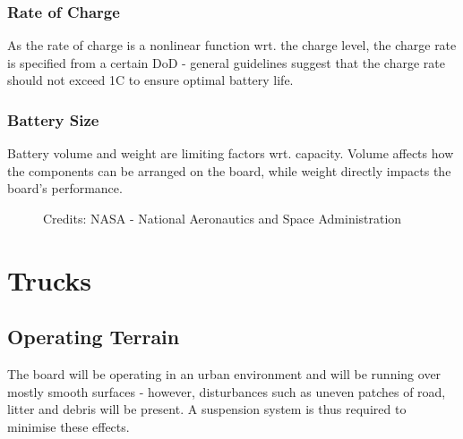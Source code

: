 \documentclass[journal,10pt]{IEEEtran}
\begin{document}
        \subsubsection{Rate of Charge}
            As the rate of charge is a nonlinear function wrt. the charge level, the charge rate is specified from a certain DoD - general guidelines suggest that the charge rate should not exceed 1C to ensure optimal battery life.
        \subsubsection{Battery Size}
        Battery volume and weight are limiting factors wrt. capacity. Volume affects how the components can be arranged on the board, while weight directly impacts the board's performance.    
            \begin{figure}[H]
                \centering
                \caption{Credits: NASA - National Aeronautics and Space Administration}
                \label{fig:Battery Size}
            \end{figure}
\section{Trucks}
    \subsection{Operating Terrain}
        The board will be operating in an urban environment and will be running over mostly smooth surfaces - however, disturbances such as uneven patches of road, litter and debris will be present. A suspension system is thus required to minimise these effects.
\end{document}
